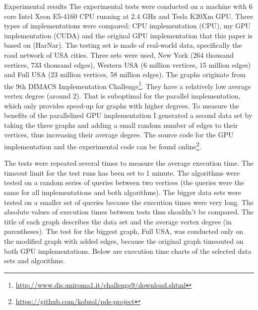 \documentclass[a4paper,12pt,notitlepage,oneside]{article}
\newcommand{\parspace}[1][]{
	\ifthenelse{\isempty{#1}}{\vspace{5mm}}{\vspace{#1}}
	\par
}
\begin{document}
\begin{section}{Experimental results}
The experimental tests were conducted on a machine with 6 core Intel\textsuperscript{\textregistered} Xeon\textsuperscript{\textregistered}
E5-4160 CPU running at 2.4 GHz and Tesla K20Xm GPU. Three types of implementations were compared:
CPU implementation (CPU), my GPU implementation (CUDA) and the original GPU implementation that this paper is based on (HarNar).
The testing set is made of real-world data, specifically the road network of USA cities.
Three sets were used, New York (264 thousand vertices, 733 thousand edges), Western USA (6 million vertices, 15 million edges) and Full USA
(23 million vertices, 58 million edges). The graphs originate from the 9th DIMACS Implementation
Challenge\footnote{\url{http://www.dis.uniroma1.it/challenge9/download.shtml}}. They have a relatively low average vertex degree (around 2).
That is suboptimal for the parallel implementation, which only provides speed-up for graphs with higher degrees. To measure the benefits of the parallelized
GPU implementation I generated a second data set by taking the three graphs and adding a small random number of edges to their vertices, thus increasing their
average degree. The source code for the GPU implementation and the experimental code can be found online\footnote{\url{https://github.com/kobzol/pds-project}}.

\parspace The tests were repeated several times to measure the average execution time. The timeout limit for the test runs has been set to 1 minute.
The algorithms were tested on a random series of queries between two vertices (the queries were the same for all implementations and both algorithms).
The bigger data sets were tested on a smaller set of queries because the execution times were very long. The absolute values of execution times between tests
thus shouldn't be compared.
The title of each graph describes the data set and the average vertex degree (in parentheses). The test for the biggest graph, Full USA, was conducted only
on the modified graph with added edges, because the original graph timeouted on both GPU implementations. Below are execution time charts of the selected
data sets and algorithms.



\end{section}
\end{document}
